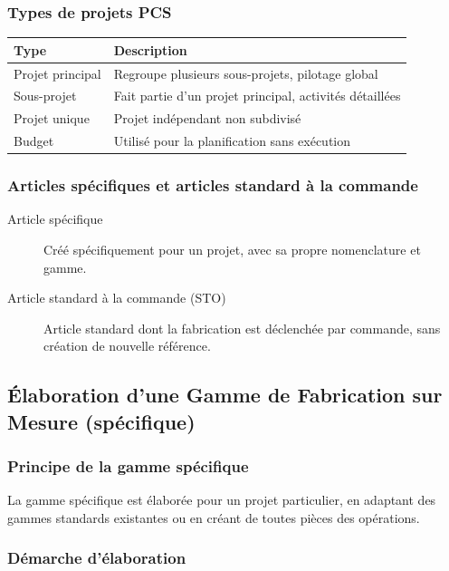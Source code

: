 \documentclass{article}
\begin{document}
\subsubsection{Types de projets PCS}

\begin{table}[h]
\centering
\begin{tabular}{|p{}|p{}|}
\hline
\textbf{Type} & \textbf{Description} \\
\hline
Projet principal & Regroupe plusieurs sous-projets, pilotage global \\
Sous-projet & Fait partie d'un projet principal, activités détaillées \\
Projet unique & Projet indépendant non subdivisé \\
Budget & Utilisé pour la planification sans exécution \\
\hline
\end{tabular}
\end{table}

\subsubsection{Articles spécifiques et articles standard à la commande}

\begin{description}
    \item[Article spécifique] Créé spécifiquement pour un projet, avec sa propre nomenclature et gamme.
    \item[Article standard à la commande (STO)] Article standard dont la fabrication est déclenchée par commande, sans création de nouvelle référence.
\end{description}

\subsection{Élaboration d'une Gamme de Fabrication sur Mesure (spécifique)}

\subsubsection{Principe de la gamme spécifique}

La gamme spécifique est élaborée pour un projet particulier, en adaptant des gammes standards existantes ou en créant de toutes pièces des opérations.

\subsubsection{Démarche d'élaboration}
\end{document}
